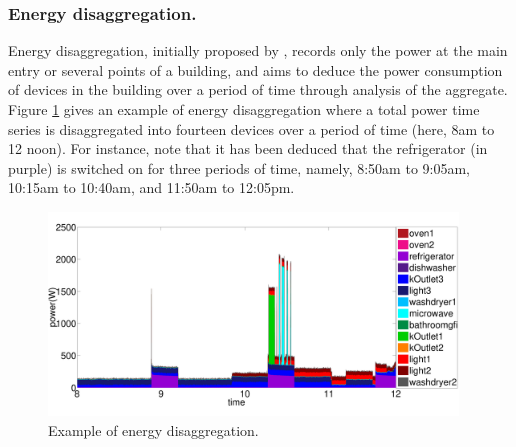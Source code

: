 
\subsubsection*{Energy disaggregation.}
Energy disaggregation, initially proposed by \cite{hart1992},
records only the power at the main entry or several points of a building,
and aims to deduce the power consumption of devices in the building over
a period of time through analysis of the aggregate.
Figure \ref{fig_energyDisaggDefinition} gives an example of energy disaggregation
where a total power time series is disaggregated into
fourteen devices over a period of time (here,
8am to 12 noon).
For instance, note that it has been deduced that the refrigerator (in purple)
is switched on for three periods of time, namely,
8:50am to 9:05am,
10:15am to 10:40am, and 11:50am to 12:05pm.

\begin{figure}[!hbp]
\centering
\includegraphics[width=0.97\textwidth]{disaggfigs/energyDisaggDefinition.pdf}
\caption{Example of energy disaggregation.}
\label{fig_energyDisaggDefinition}
\end{figure}


